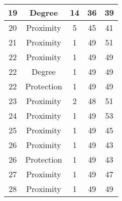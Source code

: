 \documentclass[results.tex]{subfiles}
\begin{document}
\begin{center}
\begin{tabular}{| c || c | c | c | c |}
            \hline
            19                      & Degree                       & 14                     & 36                      & 39                   \\
            \hline
            20                      & Proximity                    & 5                      & 45                      & 41                   \\
            \hline
            21                      & Proximity                    & 1                      & 49                      & 51                   \\
            \hline
            22                      & Proximity                    & 1                      & 49                      & 49                   \\
            \hline
            22                      & Degree                       & 1                      & 49                      & 49                   \\
            \hline
            22                      & Protection                   & 1                      & 49                      & 49                   \\
            \hline
            23                      & Proximity                    & 2                      & 48                      & 51                   \\
            \hline
            24                      & Proximity                    & 1                      & 49                      & 53                   \\
            \hline
            25                      & Proximity                    & 1                      & 49                      & 45                   \\
            \hline
            26                      & Proximity                    & 1                      & 49                      & 43                   \\
            \hline
            26                      & Protection                   & 1                      & 49                      & 43                   \\
            \hline
            27                      & Proximity                    & 1                      & 49                      & 47                   \\
            \hline
            28                      & Proximity                    & 1                      & 49                      & 49                   \\

\end{tabular}
\end{center}
\end{document}
